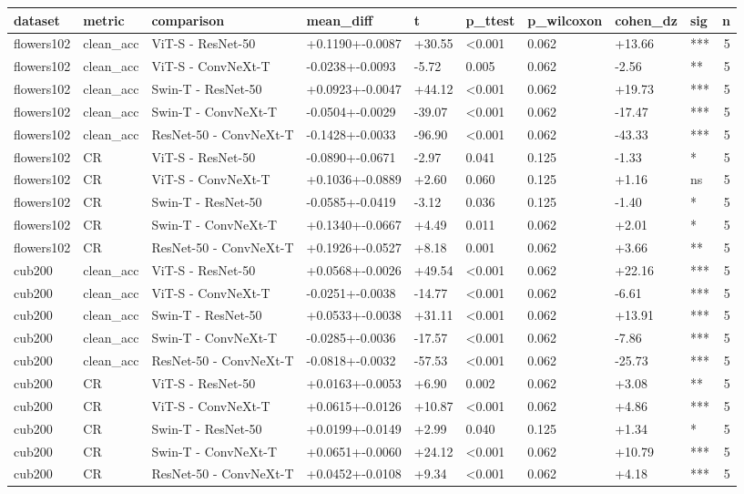 \begin{tabular}{lllllllllr}
\toprule
dataset & metric & comparison & mean_diff & t & p_ttest & p_wilcoxon & cohen_dz & sig & n \\
\midrule
flowers102 & clean_acc & ViT-S - ResNet-50 & +0.1190+-0.0087 & +30.55 & <0.001 & 0.062 & +13.66 & *** & 5 \\
flowers102 & clean_acc & ViT-S - ConvNeXt-T & -0.0238+-0.0093 & -5.72 & 0.005 & 0.062 & -2.56 & ** & 5 \\
flowers102 & clean_acc & Swin-T - ResNet-50 & +0.0923+-0.0047 & +44.12 & <0.001 & 0.062 & +19.73 & *** & 5 \\
flowers102 & clean_acc & Swin-T - ConvNeXt-T & -0.0504+-0.0029 & -39.07 & <0.001 & 0.062 & -17.47 & *** & 5 \\
flowers102 & clean_acc & ResNet-50 - ConvNeXt-T & -0.1428+-0.0033 & -96.90 & <0.001 & 0.062 & -43.33 & *** & 5 \\
flowers102 & CR & ViT-S - ResNet-50 & -0.0890+-0.0671 & -2.97 & 0.041 & 0.125 & -1.33 & * & 5 \\
flowers102 & CR & ViT-S - ConvNeXt-T & +0.1036+-0.0889 & +2.60 & 0.060 & 0.125 & +1.16 & ns & 5 \\
flowers102 & CR & Swin-T - ResNet-50 & -0.0585+-0.0419 & -3.12 & 0.036 & 0.125 & -1.40 & * & 5 \\
flowers102 & CR & Swin-T - ConvNeXt-T & +0.1340+-0.0667 & +4.49 & 0.011 & 0.062 & +2.01 & * & 5 \\
flowers102 & CR & ResNet-50 - ConvNeXt-T & +0.1926+-0.0527 & +8.18 & 0.001 & 0.062 & +3.66 & ** & 5 \\
cub200 & clean_acc & ViT-S - ResNet-50 & +0.0568+-0.0026 & +49.54 & <0.001 & 0.062 & +22.16 & *** & 5 \\
cub200 & clean_acc & ViT-S - ConvNeXt-T & -0.0251+-0.0038 & -14.77 & <0.001 & 0.062 & -6.61 & *** & 5 \\
cub200 & clean_acc & Swin-T - ResNet-50 & +0.0533+-0.0038 & +31.11 & <0.001 & 0.062 & +13.91 & *** & 5 \\
cub200 & clean_acc & Swin-T - ConvNeXt-T & -0.0285+-0.0036 & -17.57 & <0.001 & 0.062 & -7.86 & *** & 5 \\
cub200 & clean_acc & ResNet-50 - ConvNeXt-T & -0.0818+-0.0032 & -57.53 & <0.001 & 0.062 & -25.73 & *** & 5 \\
cub200 & CR & ViT-S - ResNet-50 & +0.0163+-0.0053 & +6.90 & 0.002 & 0.062 & +3.08 & ** & 5 \\
cub200 & CR & ViT-S - ConvNeXt-T & +0.0615+-0.0126 & +10.87 & <0.001 & 0.062 & +4.86 & *** & 5 \\
cub200 & CR & Swin-T - ResNet-50 & +0.0199+-0.0149 & +2.99 & 0.040 & 0.125 & +1.34 & * & 5 \\
cub200 & CR & Swin-T - ConvNeXt-T & +0.0651+-0.0060 & +24.12 & <0.001 & 0.062 & +10.79 & *** & 5 \\
cub200 & CR & ResNet-50 - ConvNeXt-T & +0.0452+-0.0108 & +9.34 & <0.001 & 0.062 & +4.18 & *** & 5 \\
\bottomrule
\end{tabular}
